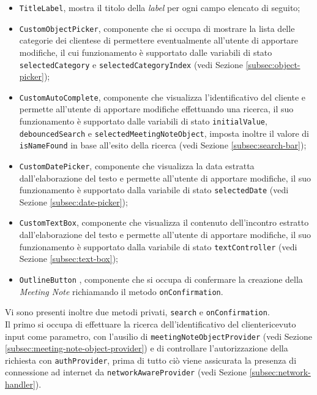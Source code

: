 \begin{itemize}
    \item \lstinline{TitleLabel}, mostra il titolo della \emph{label} per ogni campo elencato di seguito;
    \item \lstinline{CustomObjectPicker}, componente che si occupa di mostrare la lista delle categorie dei \glspl{cliente}\glsoccur e di permettere eventualmente all'utente di apportare modifiche, il cui funzionamento è supportato dalle variabili di stato \lstinline{selectedCategory} e \lstinline{selectedCategoryIndex} (vedi Sezione \ref{subsec:object-picker});
    \item \lstinline{CustomAutoComplete}, componente che visualizza l'identificativo del cliente e permette all'utente di apportare modifiche effettuando una ricerca, il suo funzionamento è supportato dalle variabili di stato \lstinline{initialValue}, \lstinline{debouncedSearch} e \lstinline{selectedMeetingNoteObject}, imposta inoltre il valore di \lstinline{isNameFound} in base all'esito della ricerca (vedi Sezione \ref{subsec:search-bar});
    \item \lstinline{CustomDatePicker}, componente che visualizza la data estratta dall'elaborazione del testo e permette all'utente di apportare modifiche, il suo funzionamento è supportato dalla variabile di stato \lstinline{selectedDate} (vedi Sezione \ref{subsec:date-picker});
    \item \lstinline{CustomTextBox}, componente che visualizza il contenuto dell'incontro estratto dall'elaborazione del testo e permette all'utente di apportare modifiche, il suo funzionamento è supportato dalla variabile di stato \lstinline{textController} (vedi Sezione \ref{subsec:text-box});
    \item \lstinline{OutlineButton} \cite{site:outline-button}, componente che si occupa di confermare la creazione della \emph{Meeting Note} richiamando il metodo \lstinline{onConfirmation}.
\end{itemize}
Vi sono presenti inoltre due metodi privati, \lstinline{search} e \lstinline{onConfirmation}. \\
Il primo si occupa di effettuare la ricerca dell'identificativo del \gls{cliente}\glsoccur ricevuto input come parametro, con l'ausilio di \lstinline{meetingNoteObjectProvider} (vedi Sezione \ref{subsec:meeting-note-object-provider}) e di controllare l'autorizzazione della richiesta con \lstinline{authProvider}, prima di tutto ciò viene assicurata la presenza di connessione ad internet da \lstinline{networkAwareProvider} (vedi Sezione \ref{subsec:network-handler}). \\
